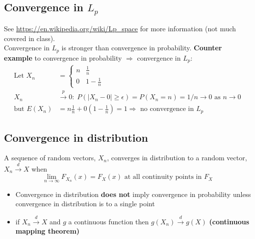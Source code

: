 \documentclass{article}
\newcommand{\abs}[1]{\lvert#1\rvert}
\begin{document}
\subsection{Convergence in $L_p$}
See \url{https://en.wikipedia.org/wiki/Lp_space} for more information (not much covered in class).\\
Convergence in $L_p$ is stronger than convergence in probability. 
\textbf{Counter example} to convergence in probability $\Longrightarrow$ convergence in $L_p$:
\begin{align*}
    \textrm{Let } X_n &= \begin{cases}
        n & \frac{1}{n}\\
        0 & 1 - \frac{1}{n}
    \end{cases}\\
    X_n &\overset{p}{\longrightarrow} 0: \; P(\abs{X_n - 0} \geq \epsilon) = P(X_n = n) = 1/n \longrightarrow 0 \textrm{ as } n \longrightarrow 0\\
    \textrm{but } E(X_n) &= n\frac{1}{n} + 0(1 - \frac{1}{n}) = 1 \Longrightarrow \textrm{ no convergence in } L_p
\end{align*}

\subsection{Convergence in distribution}
A sequence of random vectors, $X_n$, converges in distribution to a random vector, $X_n \overset{d}{\longrightarrow} X$ when
\begin{equation*}
    \lim_{n\longrightarrow \infty} F_{X_n}(x) = F_X(x) \textrm{ at all continuity points in } F_X
\end{equation*}

\begin{itemize}
    \item Convergence in distribution \textbf{does not} imply convergence in probability unless convergence in distribution is to a single point
    \item if $X_n \overset{d}{\longrightarrow} X$ and $g$ a continuous function then $g(X_n) \overset{d}{\longrightarrow} g(X)$ \textbf{(continuous mapping theorem)}
\end{itemize}
\end{document}
